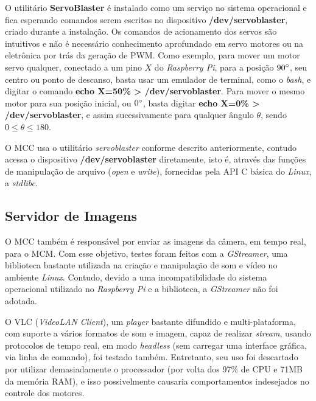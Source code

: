 O utilitário \textbf{ServoBlaster} é instalado como um serviço no sistema operacional e fica esperando comandos serem escritos no dispositivo \textbf{/dev/servoblaster}, criado durante a instalação. Os comandos de acionamento dos servos são intuitivos e não é necessário conhecimento aprofundado em servo motores ou na eletrônica por trás da geração de PWM. Como exemplo, para mover um motor servo qualquer, conectado a um pino $X$ do \textit{Raspberry Pi}, para a posição $90\degree$, seu centro ou ponto de descanso, basta usar um emulador de terminal, como o \textit{bash}, e digitar o comando \textbf{echo X=50\% > /dev/servoblaster}. Para mover o mesmo motor para sua posição inicial, ou $0\degree$, basta digitar \textbf{echo X=0\% > /dev/servoblaster}, e assim sucessivamente para qualquer ângulo $\theta$, sendo $0 \le \theta \le 180$.\par

O MCC usa o utilitário \textit{servoblaster} conforme descrito anteriormente, contudo acessa o dispositivo \textbf{/dev/servoblaster} diretamente, isto é, através das funções de manipulação de arquivo (\textit{open} e \textit{write}), fornecidas pela API C básica do \textit{Linux}, a \textit{stdlibc}.

\subsection{Servidor de Imagens}
\label{subsec:mediaserver}

O MCC também é responsável por enviar as imagens da câmera, em tempo real, para o MCM. Com esse objetivo, testes foram feitos com a \textit{GStreamer}, uma biblioteca bastante utilizada na criação e manipulação de som e vídeo no ambiente \textit{Linux}. Contudo, devido a uma incompatibilidade do sistema operacional utilizado no \textit{Raspberry Pi} e a biblioteca, a \textit{GStreamer} não foi adotada.\par

O VLC (\textit{VideoLAN Client}), um \textit{player} bastante difundido e multi-plataforma, com suporte a vários formatos de som e imagem, capaz de realizar \textit{stream}, usando protocolos de tempo real, em modo \textit{headless} (sem carregar uma interface gráfica, via linha de comando), foi testado também. Entretanto, seu uso foi descartado por utilizar demasiadamente o processador (por volta dos 97\% de CPU e 71MB da memória RAM), e isso possivelmente causaria comportamentos indesejados no controle dos motores.\par

